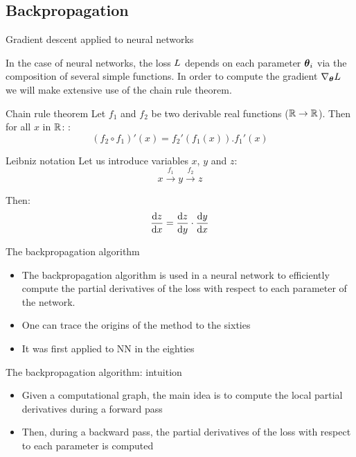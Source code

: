 \documentclass[xcolor=pdftex,dvipsnames,table,mathserif]{beamer}
\begin{document}
\subsection{Backpropagation}


\begin{frame}{Gradient descent applied to neural networks}

  In the case of neural networks, the loss $L$ depends on each parameter $\boldsymbol{\theta}_i$ via the composition of several simple functions. In order to compute the gradient $\nabla_{\boldsymbol{\theta}}L$ we will make extensive use of the chain rule theorem.

  \begin{block}{Chain rule theorem}
    Let $f_1$ and $f_2$ be two derivable real functions ($\mathbb{R} \rightarrow \mathbb{R}$). Then for all $x$ in $\mathbb{R}$:   :
    \[
     (f_2 \circ f_1)'(x) = f_2'(f_1(x)).f_1'(x)
    \]
  \end{block}


\begin{block}{Leibniz notation}
  Let us introduce variables $x$, $y$ and $z$:
  \[x \xrightarrow{f_1} y \xrightarrow{f_2} z\]

  Then:
  \[\dv{z}{x} = \dv{z}{y} \cdot \dv{y}{x} \]

\end{block}

\end{frame}


\begin{frame}{The backpropagation algorithm}

  \begin{itemize}
  \item The backpropagation algorithm is used in a neural network to efficiently compute the partial derivatives of the loss with respect to each parameter of the network.
  \item One can trace the origins of the method to the sixties
  \item It was first applied to NN in the eighties \cite{werbos_applications_1982, lecun_procedure_1985}
  \end{itemize}


\end{frame}


\begin{frame}{The backpropagation algorithm: intuition}

  \begin{itemize}
  \item Given a computational graph, the main idea is to compute the local partial derivatives during a forward pass
    \item Then, during a backward pass, the partial derivatives of the loss with respect to each parameter is computed
  \end{itemize}


\end{frame}
\end{document}
